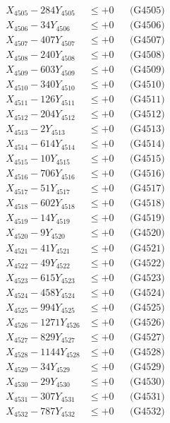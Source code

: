 \documentclass[a4paper,10pt]{article}
\begin{document}
{\begin{align}
X_{4505} - 284Y_{4505} &\leq +0 && \text{(G4505)} \\
X_{4506} - 34Y_{4506} &\leq +0 && \text{(G4506)} \\
X_{4507} - 407Y_{4507} &\leq +0 && \text{(G4507)} \\
X_{4508} - 240Y_{4508} &\leq +0 && \text{(G4508)} \\
X_{4509} - 603Y_{4509} &\leq +0 && \text{(G4509)} \\
X_{4510} - 340Y_{4510} &\leq +0 && \text{(G4510)} \\
\allowbreak
X_{4511} - 126Y_{4511} &\leq +0 && \text{(G4511)} \\
X_{4512} - 204Y_{4512} &\leq +0 && \text{(G4512)} \\
X_{4513} - 2Y_{4513} &\leq +0 && \text{(G4513)} \\
X_{4514} - 614Y_{4514} &\leq +0 && \text{(G4514)} \\
X_{4515} - 10Y_{4515} &\leq +0 && \text{(G4515)} \\
X_{4516} - 706Y_{4516} &\leq +0 && \text{(G4516)} \\
X_{4517} - 51Y_{4517} &\leq +0 && \text{(G4517)} \\
X_{4518} - 602Y_{4518} &\leq +0 && \text{(G4518)} \\
X_{4519} - 14Y_{4519} &\leq +0 && \text{(G4519)} \\
X_{4520} - 9Y_{4520} &\leq +0 && \text{(G4520)} \\
\allowbreak
X_{4521} - 41Y_{4521} &\leq +0 && \text{(G4521)} \\
X_{4522} - 49Y_{4522} &\leq +0 && \text{(G4522)} \\
X_{4523} - 615Y_{4523} &\leq +0 && \text{(G4523)} \\
X_{4524} - 458Y_{4524} &\leq +0 && \text{(G4524)} \\
X_{4525} - 994Y_{4525} &\leq +0 && \text{(G4525)} \\
X_{4526} - 1271Y_{4526} &\leq +0 && \text{(G4526)} \\
X_{4527} - 829Y_{4527} &\leq +0 && \text{(G4527)} \\
X_{4528} - 1144Y_{4528} &\leq +0 && \text{(G4528)} \\
X_{4529} - 34Y_{4529} &\leq +0 && \text{(G4529)} \\
X_{4530} - 29Y_{4530} &\leq +0 && \text{(G4530)} \\
\allowbreak
X_{4531} - 307Y_{4531} &\leq +0 && \text{(G4531)} \\
X_{4532} - 787Y_{4532} &\leq +0 && \text{(G4532)} \\

\end{align}}
\end{document}
